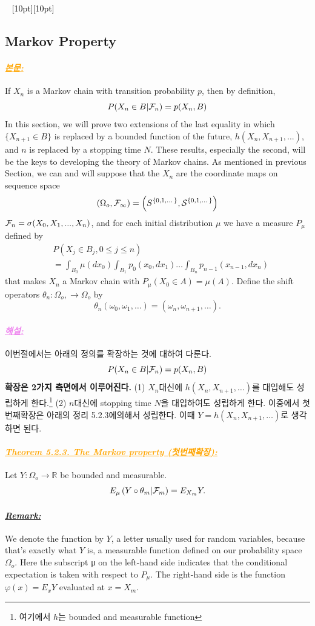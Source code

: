\documentclass[12pt,oneside,english,a4paper]{article}
\newcommand{\dash}{\noindent \newline\textcolor{black}{\hrulefill~ \raisebox{-2.5pt}[10pt][10pt]{\leafright \decofourleft \decothreeleft  \aldineright \decotwo \floweroneleft \decoone   \floweroneright \decotwo \aldineleft\decothreeright \decofourright \leafleft} ~  \hrulefill}}
\newcommand{\para}[1]{\paragraph{\LARGE\it\underline{\textbf{#1:}}}\LARGE}
\newcommand{\paraviolet}[1]{\paragraph{\LARGE\textcolor{violet}{\it\underline{\textbf{#1:}}}}\LARGE}
\newcommand{\paraorange}[1]{\paragraph{\LARGE\textcolor{orange}{\it\underline{\textbf{#1:}}}}\LARGE}
\begin{document}
\dash

\subsection{Markov Property}
\paraorange{본문} If $X_n$ is a Markov chain with transition probability $p$, then by definition, 
\[
P(X_n \in B |{\cal F}_n)=p(X_n,B)
\]
In this section, we will prove two extensions of the last equality in which
$\{X_{n+1} \in B\}$ is replaced by a bounded function of the future, $h(X_n,X_{n+1},...)$, and $n$ is replaced by a stopping time $N$. These results, especially the second, will be the keys to developing the theory of Markov chains. As mentioned in previous Section, we can and will suppose that the $X_n$ are the coordinate maps on sequence space
\[
(\Omega_o,{\cal F}_{\infty})=\Big(S^{\{0,1,\dots\}},{\cal S}^{\{0,1,\dots\}}\Big)
\]
${\cal F}_n = \sigma(X_0, X_1,..., X_n)$, and for each initial distribution $\mu$ we have a measure $P_{\mu}$ defined by
\begin{align*}
& P(X_j\in B_j, 0\leq j\leq n)\\
&=\int_{B_0}\mu(dx_0)\int_{B_1}p_0(x_0,dx_1)\dots\int_{B_n}p_{n-1}(x_{n-1},dx_n)
\end{align*}
that makes $X_n$ a Markov chain with $P_{\mu}(X_0\in A) = \mu(A)$. Define the shift operators $\theta_n:\Omega_o,\to \Omega_o$ by 
\[
\theta_n(\omega_0,\omega_1,\dots)=(\omega_n,\omega_{n+1},\dots).
\]

\paraviolet{해설} 이번절에서는 아래의 정의를 확장하는 것에 대하여 다룬다. 
\[
P(X_n \in B |{\cal F}_n)=p(X_n,B)
\]
{\bf 확장은 2가지 측면에서 이루어진다.} (1) $X_n$대신에 $h(X_n,X_{n+1},\dots)$를 대입해도 성립하게 한다.\footnote{여기에서 $h$는 bounded and measurable function} (2) $n$대신에 stopping time $N$을 대입하여도 성립하게 한다. 이중에서 첫번째확장은 아래의 정리 5.2.3에의해서 성립한다. 이때 $Y=h(X_n,X_{n+1},\dots)$로 생각하면 된다. 

\paraorange{Theorem 5.2.3. The Markov property (첫번째확장)} Let $Y :\Omega_o\to \mathbb{R}$ be bounded and measurable.
\[
E_{\mu}\left(Y \circ \theta_m|{\cal F}_m \right)= E_{X_m} Y.
\]

\para{Remark} We denote the function by $Y$, a letter usually used for random variables, because that’s exactly what $Y$ is, a measurable function defined on our probability space $\Omega_o$. Here the subscript μ on the left-hand side indicates that the conditional expectation is taken with respect to $P_{\mu}$. The right-hand side is the function $\varphi(x)=E_xY$ evaluated at $x = X_m$.
\end{document}
